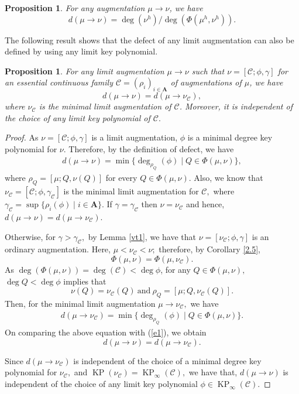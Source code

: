 \documentclass[11pt]{amsart}
\newtheorem{proposition}[theorem]{Proposition}
\theoremstyle{definition}
\theoremstyle{remark}
\numberwithin{equation}{section}
\begin{document}
 \begin{proposition}\label{dh}
 	For any augmentation $\mu\longrightarrow\nu$, we have 
 	\[d(\mu\longrightarrow\nu)=\deg(\nu^h)/ \deg (\Phi(\mu^h,\nu^h)).\]
 \end{proposition}
 
 The following result shows that the defect of any limit augmentation can also be defined by using any limit key polynomial.
 \begin{proposition}
 	For any limit augmentation $\mu\longrightarrow \nu$ such that $\nu=[\mathcal{C};\phi,\gamma]$ for an essential continuous family $\mathcal{C}=(\rho_i)_{i\in\mathbf{A}}$ of augmentations of $\mu$, we have \[d(\mu\longrightarrow\nu)=d(\mu\longrightarrow\nu_{\mathcal{C}}),\] where $\nu_{\mathcal{C}}$ is the minimal limit augmentation of  $\mathcal{C}$. Moreover, it is independent of the choice of any limit key polynomial of $\mathcal{C}.$
 \end{proposition}
 \begin{proof}
 	As $\nu=[\mathcal{C};\phi,\gamma]$ is a limit augmentation, $\phi$ is a minimal degree key polynomial for $\nu.$ Therefore, by the definition of defect, we have
 	\begin{align}\label{e1}
 		d(\mu\longrightarrow\nu)=\min\{\deg_{\rho_Q}(\phi) \mid Q\in \Phi(\mu,\nu)\},
 		\end{align}
 		where $\rho_Q=[\mu;Q,\nu(Q)]$ for every $Q\in\Phi(\mu,\nu).$ Also, we know that $\nu_{\mathcal{C}}=[\mathcal{C};\phi,\gamma_{\mathcal{C}}]$ is the minimal limit augmentation for $\mathcal{C},$ where $\gamma_{\mathcal{C}}=\sup\{\rho_i(\phi)\mid i\in\mathbf{A}\}.$ If $\gamma=\gamma_\mathcal{C}$ then $\nu=\nu_\mathcal{C}$ and hence, $d(\mu\longrightarrow\nu)=d(\mu\longrightarrow\nu_{\mathcal{C}}).$
 		
 		 Otherwise, for $\gamma>\gamma_\mathcal{C},$ by Lemma \ref{vt1}, we have that $\nu=[\nu_{\mathcal{C}};\phi,\gamma]$ is an ordinary augmentation. Here, $\mu<\nu_\mathcal{C}<\nu;$ therefore, by Corollary \ref{2.5}, \[\Phi(\mu,\nu)=\Phi(\mu,\nu_\mathcal{C}).\] As $\deg(\Phi(\mu,\nu))=\deg(\mathcal{C})<\deg\phi$, for any $Q\in\Phi(\mu,\nu),$ $\deg Q<\deg\phi$ implies that \[\nu(Q)=\nu_{\mathcal{C}}(Q) \ \text{and}\  \rho_Q=[\mu;Q,\nu_\mathcal{C}(Q)].\] Then, for the minimal limit augmentation $\mu\longrightarrow\nu_\mathcal{C},$ we have \begin{align*}
 			d(\mu\longrightarrow\nu_\mathcal{C})=\min\{\deg_{\rho_Q}(\phi) \mid Q\in \Phi(\mu,\nu)\}.
 		\end{align*}
 		On comparing the above equation with (\ref{e1}), we obtain
 		\[d(\mu\longrightarrow\nu)=d(\mu\longrightarrow\nu_{\mathcal{C}}).\] 
 		
 		Since $d(\mu\longrightarrow\nu_{\mathcal{C}})$ is independent of the choice of a minimal degree key polynomial for $\nu_\mathcal{C},$ and $\operatorname{KP}(\nu_\mathcal{C})=\operatorname{KP}_{\infty}(\mathcal{C}),$ we have that, $d(\mu\longrightarrow\nu)$ is independent of the choice of any limit key polynomial $\phi\in\operatorname{KP}_{\infty}(\mathcal{C}).$
  \end{proof}
  
\end{document}

